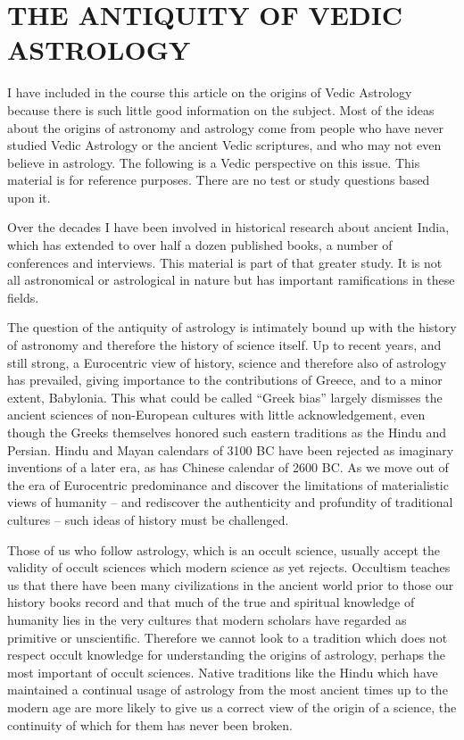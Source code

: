 \section{THE ANTIQUITY OF VEDIC ASTROLOGY}
 

I have included in the course this article on the origins of Vedic Astrology because there is such little good information on the subject. Most of the ideas about the origins of astronomy and astrology come from people who have never studied Vedic Astrology or the ancient Vedic scriptures, and who may not even believe in astrology. The following is a Vedic perspective on this issue. This material is for reference purposes. There are no test or study questions based upon it.

 

Over the decades I have been involved in historical research about ancient India, which has extended to over half a dozen published books, a number of conferences and interviews. This material is part of that greater study. It is not all astronomical or astrological in nature but has important ramifications in these fields.

 

The question of the antiquity of astrology is intimately bound up with the history of astronomy and therefore the history of science itself. Up to recent years, and still strong, a Eurocentric view of history, science and therefore also of astrology has prevailed, giving importance to the contributions of Greece, and to a minor extent, Babylonia. This what could be called “Greek bias” largely dismisses the ancient sciences of non-European cultures with little acknowledgement, even though the Greeks themselves honored such eastern traditions as the Hindu and Persian. Hindu and Mayan calendars of 3100 BC have been rejected as imaginary inventions of a later era, as has Chinese calendar of 2600 BC. As we move out of the era of Eurocentric predominance and discover the limitations of materialistic views of humanity – and rediscover the authenticity and profundity of traditional cultures – such ideas of history must be challenged.

 

Those of us who follow astrology, which is an occult science, usually accept the validity of occult sciences which modern science as yet rejects. Occultism teaches us that there have been many civilizations in the ancient world prior to those our history books record and that much of the true and spiritual knowledge of humanity lies in the very cultures that modern scholars have regarded as primitive or unscientific. Therefore we cannot look to a tradition which does not respect occult knowledge for understanding the origins of astrology, perhaps the most important of occult sciences. Native traditions like the Hindu which have maintained a continual usage of astrology from the most ancient times up to the modern age are more likely to give us a correct view of the origin of a science, the continuity of which for them has never been broken.

